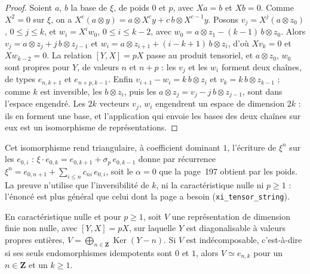 \begin{proof}
Soient $a$, $b$ la base de $\xi$, de poids $0$ et $p$, avec $Xa = b$ et $Xb = 0$. Comme $X^2 = 0$ sur $\xi$, on a $X^c(a \otimes y) = a \otimes X^c y + c\, b \otimes X^{c-1} y$. Posons $v_j = X^j(a \otimes z_0)$, $0 \leq j \leq k$, et $w_i = X^i w_0$, $0 \leq i \leq k - 2$, avec $w_0 = a \otimes z_1 - (k-1)\, b \otimes z_0$. Alors $v_j = a \otimes z_j + j\, b \otimes z_{j-1}$ et $w_i = a \otimes z_{i+1} + (i - k + 1)\, b \otimes z_i$, d'où $X v_k = 0$ et $X w_{k-2} = 0$. La relation $[Y, X] = pX$ passe au produit tensoriel, et $a \otimes z_0$, $w_0$ sont propres pour $Y$, de valeurs $n$ et $n + p$ : les $v_j$ et les $w_i$ forment deux chaînes, de types $e_{n,k+1}$ et $e_{n+p,k-1}$. Enfin $v_{i+1} - w_i = k\, b \otimes z_i$ et $v_k = k\, b \otimes z_{k-1}$ ; comme $k$ est inversible, les $b \otimes z_i$, puis les $a \otimes z_j = v_j - j\, b \otimes z_{j-1}$, sont dans l'espace engendré. Les $2k$ vecteurs $v_j$, $w_i$ engendrent un espace de dimension $2k$ : ils en forment une base, et l'application qui envoie les bases des deux chaînes sur eux est un isomorphisme de représentations.
\end{proof}

\begin{remarque}
Cet isomorphisme rend triangulaire, à coefficient dominant $1$, l'écriture de $\xi^n$ sur les $e_{0,i}$ : $\xi \cdot e_{0,k} = e_{0,k+1} + \sigma_p\, e_{0,k-1}$ donne par récurrence $\xi^n = e_{0,n+1} + \sum_{i \leq n} c_{ni}\, e_{0,i}$, soit le $\alpha = 0$ que la page~197 obtient par les poids. La preuve n'utilise que l'inversibilité de $k$, ni la caractéristique nulle ni $p \geq 1$ : l'énoncé est plus général que celui dont la page a besoin (\texttt{xi\_tensor\_string}).
\end{remarque}

\begin{enonce}
En caractéristique nulle et pour $p \geq 1$, soit $V$ une représentation de dimension finie non nulle, avec $[Y, X] = pX$, sur laquelle $Y$ est diagonalisable à valeurs propres entières, $V = \bigoplus_{n \in \mathbf Z} \operatorname{Ker}(Y - n)$. Si $V$ est indécomposable, c'est-à-dire si ses seuls endomorphismes idempotents sont $0$ et $1$, alors $V \simeq e_{n,k}$ pour un $n \in \mathbf Z$ et un $k \geq 1$.
\end{enonce}

